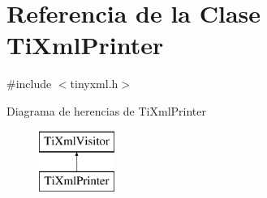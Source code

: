 \hypertarget{class_ti_xml_printer}{\section{Referencia de la Clase Ti\-Xml\-Printer}
\label{class_ti_xml_printer}
}


{\ttfamily \#include $<$tinyxml.\-h$>$}

Diagrama de herencias de Ti\-Xml\-Printer\begin{figure}[H]
\begin{center}
\leavevmode
\includegraphics[height=2.000000cm]{class_ti_xml_printer}
\end{center}
\end{figure}

